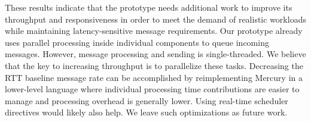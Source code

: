 These results indicate that the prototype needs additional work to
improve its throughput and responsiveness in order to meet the demand
of realistic workloads while maintaining latency-sensitive message
requirements.  Our prototype already uses parallel processing inside
individual components to queue incoming messages.  However, message
processing and sending is single-threaded.  We believe that the key to
increasing throughput is to parallelize these tasks. Decreasing the
RTT baseline message rate can be accomplished by reimplementing
Mercury in a lower-level language where individual processing time
contributions are easier to manage and processing overhead is
generally lower.  Using real-time scheduler directives would likely
also help. We leave such optimizations as future work.

